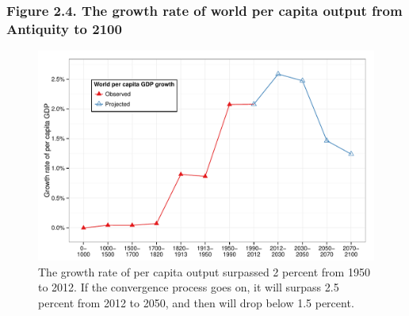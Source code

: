 \documentclass[t]{beamer}\usepackage[]{graphicx}\usepackage[]{color}
\newenvironment{knitrout}{}{} %
\begin{document}
\begin{frame}[label=Figure_2_4]
\frametitle{Figure 2.4. The growth rate of world per capita output from Antiquity to 2100}
\begin{figure}[t]
\begin{minipage}[b]{\textwidth}
\centering
\begin{knitrout}\footnotesize
{}\color{fgcolor}

{\centering \includegraphics[width=1\linewidth]{figures/color/Figure_2_4} 

}



\end{knitrout}
\caption{The growth rate of per capita output surpassed 2 percent from 1950 to 2012. If the convergence process goes on, it will surpass 2.5 percent from 2012 to 2050, and then will drop below 1.5 percent.}
\end{minipage}
\end{figure}
\end{frame}
\end{document}
